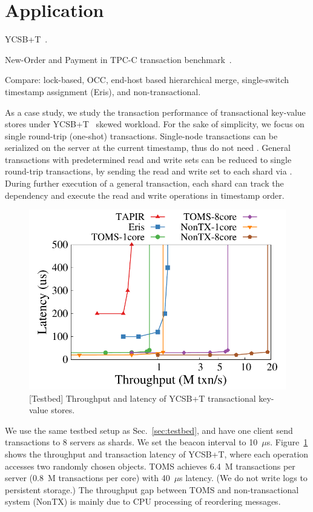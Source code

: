 \section{Application}
\label{sec:application}


YCSB+T~\cite{dey2014ycsbt}.

New-Order and Payment in TPC-C transaction benchmark~\cite{tpcc}.

Compare: lock-based, OCC, end-host based hierarchical merge, single-switch timestamp assignment (Eris), \sys and non-transactional.



As a case study, we study the transaction performance of transactional key-value stores under YCSB+T~\cite{dey2014ycsbt} skewed workload.
For the sake of simplicity, we focus on single round-trip (one-shot) transactions. Single-node transactions can be serialized on the server at the current timestamp, thus do not need \sys. General transactions with predetermined read and write sets can be reduced to single round-trip transactions, by sending the read and write set to each shard via \sys. During further execution of a general transaction, each shard can track the dependency and execute the read and write operations in timestamp order.




\begin{figure}[t]
\centering
\includegraphics[width=.45\textwidth]{gnuplot/ycsb.pdf}
\caption{[Testbed] Throughput and latency of YCSB+T transactional key-value stores.}
\label{fig:ycsb}
\end{figure}


We use the same testbed setup as Sec.~\ref{sec:testbed}, and have one \sys client send transactions to 8 \sys servers as shards. We set the beacon interval to 10~$\mu$s.
Figure~\ref{fig:ycsb} shows the throughput and transaction latency of YCSB+T, where each operation accesses two randomly chosen objects.
TOMS achieves 6.4~M transactions per server (0.8~M transactions per core) with 40~$\mu$s latency. (We do not write logs to persistent storage.)
The throughput gap between TOMS and non-transactional system (NonTX) is mainly due to CPU processing of reordering messages.

